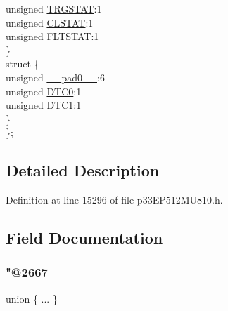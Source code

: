 \begin{DoxyCompactItemize}
\begin{tabbing}
\>\>unsigned \hyperlink{structtag_p_w_m_c_o_n6_b_i_t_s_a57c6135a12bae69a2a2cac5ed50a4a6d}{TRGSTAT}:1\\
\>\>unsigned \hyperlink{structtag_p_w_m_c_o_n6_b_i_t_s_a3ff6da0b6372a30fc64f07d769a3ddab}{CLSTAT}:1\\
\>\>unsigned \hyperlink{structtag_p_w_m_c_o_n6_b_i_t_s_ac4cd94e1f740f5bc85b265ed453769f0}{FLTSTAT}:1\\
\>\} \\
\>struct \{\\
\>\>unsigned \hyperlink{structtag_p_w_m_c_o_n6_b_i_t_s_adf71f3d8410c1f1dbbc96680a92c49af}{\_\_pad0\_\_}:6\\
\>\>unsigned \hyperlink{structtag_p_w_m_c_o_n6_b_i_t_s_a9aea5589386f8c7d9cb07683fc730825}{DTC0}:1\\
\>\>unsigned \hyperlink{structtag_p_w_m_c_o_n6_b_i_t_s_a41e45e30f2c99c731b1d2bca6060d8ad}{DTC1}:1\\
\>\} \\
\}; \\

\end{tabbing}\end{DoxyCompactItemize}


\subsection{Detailed Description}


Definition at line 15296 of file p33\+E\+P512\+M\+U810.\+h.



\subsection{Field Documentation}
\mbox{\label{structtag_p_w_m_c_o_n6_b_i_t_s_aaacd50b39ea63b10b76b3c4478d0c733}} 
\subsubsection{\texorpdfstring{"@2667}{@2667}}
{\footnotesize\ttfamily union \{ ... \} }

\mbox{\label{structtag_p_w_m_c_o_n6_b_i_t_s_adf71f3d8410c1f1dbbc96680a92c49af}} 
